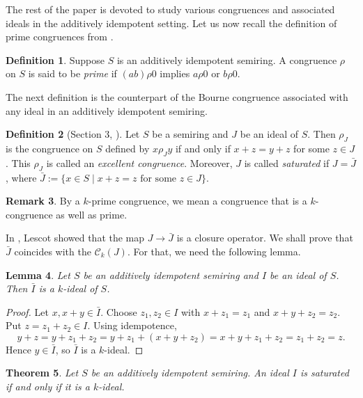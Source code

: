 \documentclass[11pt,leqno]{amsart}
\newtheorem{theorem}{Theorem}[section]
\newtheorem{lemma}[theorem]{Lemma}
\theoremstyle{definition}
\newtheorem{definition}[theorem]{Definition}
\newtheorem{remark}[theorem]{Remark}
\numberwithin{equation}{section}
\begin{document}
The rest of the paper is devoted to study various congruences and associated ideals in the additively idempotent setting. Let us now recall the definition of prime congruences from  \cite[Definition 3.4]{Lescot11}.

 \begin{definition}
     Suppose $S$ is an additively idempotent semiring. A congruence $\rho$ on $S$ is said to be \emph{prime} if $(ab) \rho 0$ implies $a \rho 0$ or $b \rho 0$. 
 \end{definition}
 
 The next definition is the counterpart of the Bourne congruence associated with any ideal in an additively idempotent semiring. 
 
 \begin{definition}[Section 3, \cite{Lescot11}]\label{Def: excellent congruences and saturated ideals}
     Let $S$ be a semiring and $J$ be an ideal of $S$. Then $\rho_J$ is the congruence on $S$ defined by $x\rho_Jy$ if and only if $x+z=y+z$ for some $z\in J$. This $\rho_J$ is called an \emph{excellent congruence}. Moreover, $J$ is called \emph{saturated} if $J=\bar J$, where $\bar J:=\{x\in S\mid x+z=z\text{ for some }z\in J\}$.
 \end{definition}

 \begin{remark}
 By a $k$-prime congruence, we mean a congruence that is a $k$-congruence as well as prime.    
 \end{remark}

     In \cite[Theorem 3.7]{Lescot11}, Lescot showed that the map $J\to \bar{J}$ is a closure operator. We shall prove that $\bar{J}$ coincides with the $\mathcal{C}_k(J)$. For that, we need the following lemma. 
 
 \begin{lemma}\label{loc10}
     Let $S$ be an additively idempotent semiring and $I$ be an ideal of $S$. Then $\bar{I}$ is a $k$-ideal of $S$.
 \end{lemma}
 
 \begin{proof}
Let $x,x+y\in\bar I$. Choose $z_1,z_2\in I$ with $x+z_1=z_1$ and $x+y+z_2=z_2$. Put $z=z_1+z_2\in I$. Using idempotence,
\[
y+z=y+z_1+z_2=y+z_1+(x+y+z_2)=x+y+z_1+z_2=z_1+z_2=z.
\]
Hence $y\in\bar I$, so $\bar I$ is a $k$-ideal.
 \end{proof}
 
 \begin{theorem}\label{saturated iff k-ideal}
     Let $S$ be an additively idempotent semiring. An ideal $I$ is saturated if and only if it is a $k$-ideal.
 \end{theorem}
 
\end{document}

